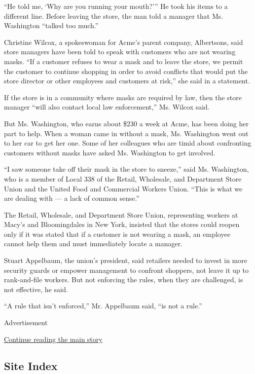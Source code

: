 ``He told me, `Why are you running your mouth?''' He took his items to a
different line. Before leaving the store, the man told a manager that
Ms. Washington ``talked too much.''

Christine Wilcox, a spokeswoman for Acme's parent company, Albertsons,
said store managers have been told to speak with customers who are not
wearing masks. ``If a customer refuses to wear a mask and to leave the
store, we permit the customer to continue shopping in order to avoid
conflicts that would put the store director or other employees and
customers at risk,'' she said in a statement.

If the store is in a community where masks are required by law, then the
store manager ``will also contact local law enforcement,'' Ms. Wilcox
said.

But Ms. Washington, who earns about \$230 a week at Acme, has been doing
her part to help. When a woman came in without a mask, Ms. Washington
went out to her car to get her one. Some of her colleagues who are timid
about confronting customers without masks have asked Ms. Washington to
get involved.

``I saw someone take off their mask in the store to sneeze,'' said Ms.
Washington, who is a member of Local 338 of the Retail, Wholesale, and
Department Store Union and the United Food and Commercial Workers Union.
``This is what we are dealing with --- a lack of common sense.''

The Retail, Wholesale, and Department Store Union, representing workers
at Macy's and Bloomingdales in New York, insisted that the stores could
reopen only if it was stated that if a customer is not wearing a mask,
an employee cannot help them and must immediately locate a manager.

Stuart Appelbaum, the union's president, said retailers needed to invest
in more security guards or empower management to confront shoppers, not
leave it up to rank-and-file workers. But not enforcing the rules, when
they are challenged, is not effective, he said.

``A rule that isn't enforced,'' Mr. Appelbaum said, ``is not a rule.''

Advertisement

\protect\hyperlink{after-bottom}{Continue reading the main story}

\hypertarget{site-index}{%
\subsection{Site Index}\label{site-index}}


